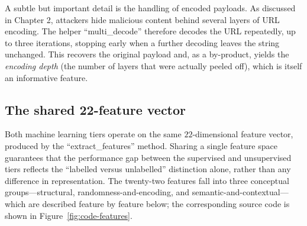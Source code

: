 \documentclass[12pt,a4paper]{report}
\begin{document}
A subtle but important detail is the handling of encoded payloads. As
discussed in Chapter 2, attackers hide malicious content
behind several layers of URL encoding. The helper ``multi\_decode''
therefore decodes the URL repeatedly, up to three iterations, stopping early
when a further decoding leaves the string unchanged. This recovers the
original payload and, as a by-product, yields the \emph{encoding depth}
(the number of layers that were actually peeled off), which is itself an
informative feature.

\subsection{The shared 22-feature vector}

Both machine learning tiers operate on the same $22$-dimensional feature
vector, produced by the ``extract\_features'' method. Sharing a single
feature space guarantees that the performance gap between the supervised and
unsupervised tiers reflects the ``labelled versus unlabelled'' distinction
alone, rather than any difference in representation. The twenty-two features
fall into three conceptual groups---structural, randomness-and-encoding, and
semantic-and-contextual---which are described feature by feature below; the
corresponding source code is shown in Figure~\ref{fig:code-features}.
\end{document}
